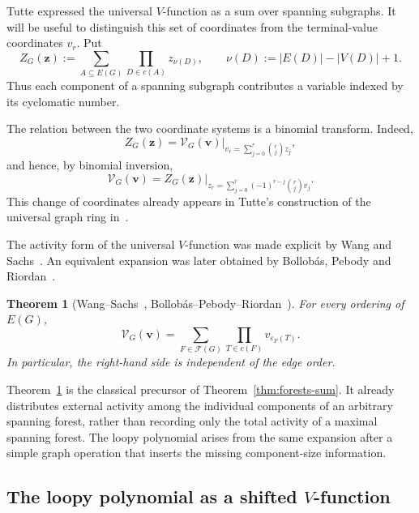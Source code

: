 \documentclass[11pt]{article}
\theoremstyle{plain}
\newtheorem{theorem}{Theorem}[section]
\theoremstyle{definition}
\renewcommand{\mathcal}{\mathscr}
\newcommand{\cF}{\mathcal{F}}    %
\newcommand{\cV}{\mathcal{V}}    %
\newcommand{\bv}{\mathbf{v}}
\newcommand{\bz}{\mathbf{z}}
\newcommand{\eps}{\varepsilon}
\numberwithin{equation}{section}
\begin{document}
Tutte expressed the universal $V$-function as a sum over spanning
subgraphs.  It will be useful to distinguish this set of coordinates from the
terminal-value coordinates $v_r$.  Put
\begin{equation}\label{eq:Tutte-Z}
   Z_G(\bz)
   :=
   \sum_{A\subseteq E(G)}
   \prod_{D\in c(A)} z_{\nu(D)},
   \qquad
   \nu(D):=|E(D)|-|V(D)|+1.
\end{equation}
Thus each component of a spanning subgraph contributes a variable indexed by
its cyclomatic number.

The relation between the two coordinate systems is a binomial transform.
Indeed,
\begin{equation}\label{eq:V-Z-binomial}
   Z_G(\bz)
   =
   \left.
      \cV_G(\bv)
   \right|_{
      v_r=\sum_{j=0}^r\binom{r}{j}z_j
   },
\end{equation}
and hence, by binomial inversion,
\begin{equation}\label{eq:Z-V-binomial}
   \cV_G(\bv)
   =
   \left.
      Z_G(\bz)
   \right|_{
      z_r=\sum_{j=0}^r(-1)^{r-j}\binom{r}{j}v_j
   }.
\end{equation}
This change of coordinates already appears in Tutte's construction of the universal graph ring in~\cite{Tu1}.

The activity form of the universal $V$-function was made explicit by Wang
and Sachs~\cite{WS}.  An equivalent expansion was later obtained by
Bollob\'as, Pebody and Riordan~\cite{BPR}.

\begin{theorem}[Wang--Sachs~\cite{WS}, Bollob\'as--Pebody--Riordan~\cite{BPR}]
\label{thm:V-forest}
For every ordering of $E(G)$,
\begin{equation}\label{eq:V-forest}
   \cV_G(\bv)
   =
   \sum_{F\in\cF(G)}
   \prod_{T\in c(F)}v_{\eps_F(T)}.
\end{equation}
In particular, the right-hand side is independent of the edge order.
\end{theorem}

Theorem~\ref{thm:V-forest} is the classical precursor of
Theorem~\ref{thm:forests-sum}.  It already distributes external
activity among the individual components of an arbitrary spanning forest,
rather than recording only the total activity of a maximal spanning forest.
The loopy polynomial arises from the same expansion after a simple graph
operation that inserts the missing component-size information.

\subsection{The loopy polynomial as a shifted \texorpdfstring{$V$}{V}-function}\label{subsec:loopy-V}
\end{document}
